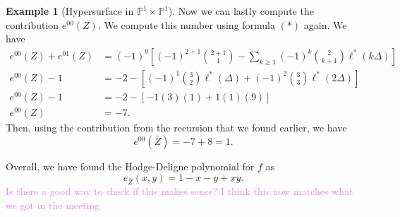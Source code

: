 \documentclass{article}
\theoremstyle{definition}
\newtheorem{example}[theorem]{Example}
\theoremstyle{remark}
\newcommand{\wg}[1]{\textcolor{violet}{#1}}
\newcommand{\C}{\mathbb C}
\renewcommand{\P}{\mathbb P}
\newcommand{\cross}{\times}
\begin{document}
\begin{example}[Hypersurface in $\P^1 \times \P^1$]
    Now we can lastly compute the contribution $e^{00}(Z)$.
    We compute this number using formula $(*)$ again.
    We have 
    \begin{align*}
        e^{00}(Z) + e^{01}(Z) &= (-1)^{0}\left[
            (-1)^{2 + 1}\binom{2+1}{1} - \sum_{k \geq 1} (-1)^{k} \binom{2}{k+ 1} \ell^*(k \Delta)
        \right] \\
        e^{00}(Z)  - 1 &= -2 - \left[
            (-1)^{1} \binom{3}{2} \ell^*(\Delta) + (-1)^{2}\binom{3}{3}\ell^*(2\Delta) 
        \right] \\
        e^{00}(Z) -1 &= -2 - \left[-1(3)(1) + 1(1)(9)\right] \\
        e^{00}(Z) &= -7.
    \end{align*}
    Then, using the contribution from the recursion that we found
    earlier, we have 
    \[
        e^{00}(\bar Z) = -7 + 8 = 1. 
    \]

    Overall, we have found the Hodge-Deligne polynomial for $f$ as
    \[
        e_{\bar{Z}}(x,y) = 1 - x - y + xy.
    \]
    \wg{Is there a good way to check if this makes sense? I think this
    now matches what we got in the meeting}
\end{example}

\end{document}
